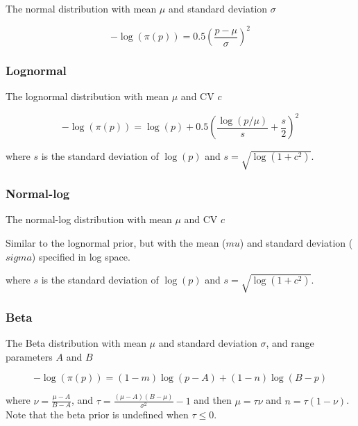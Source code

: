 The normal distribution with mean $\mu$ and standard deviation $\sigma$

\begin{equation}
 - \log \left(\pi \left(p \right) \right) = 0.5\left(\frac{p - \mu}
{\sigma }\right)^2
\end{equation}

\subsubsection{Lognormal}\label{sec:Prior-Lognormal}

The lognormal distribution with mean $\mu$ and CV $c$

\begin{equation}
 - \log \left(\pi \left(p \right) \right) = \log \left( p \right) + 0.5 \left( \frac{\log \left( p / \mu \right)}{s} + \frac{s}{2} \right)^2
\end{equation}

where $s$ is the standard deviation of $\log(p)$ and $s= \sqrt{\log \left(1+c^2 \right)}$.

\subsubsection{Normal-log}\label{sec:Prior-NormalLog}

The normal-log distribution  with mean $\mu$ and CV $c$

Similar to the lognormal prior, but with the mean ($mu$) and standard deviation ($sigma$) specified in log space.

where $s$ is the standard deviation of $\log(p)$ and $s= \sqrt{\log \left(1+c^2 \right)}$.

\subsubsection{Beta}\label{sec:Prior-Beta}

The Beta distribution with mean $\mu$ and standard deviation $\sigma$, and range parameters $A$ and $B$

\begin{equation}
 - \log \left(\pi \left( p \right) \right) = \left( 1 - m \right) \log \left( p - A \right) + \left( 1 - n \right)\log \left( B - p \right)
\end{equation}

where $\nu  = \frac{\mu  - A}{B - A}$, and $\tau = \frac{\left(\mu -A \right)\left(B - \mu \right)}{\sigma ^2} - 1$ and then $\mu=\tau \nu$ and $n=\tau(1-\nu)$. Note that the beta prior is undefined when $\tau \leq 0$.

